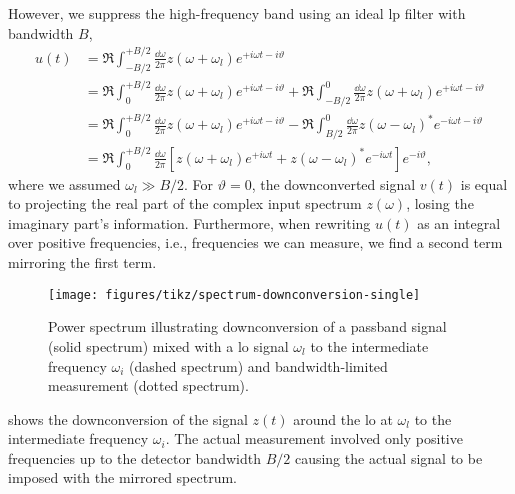 However, we suppress the high-frequency band using an ideal \gls{lp} filter with bandwidth $B$,
\begin{equation}
	\begin{split}
		u(t)
		&=
		\Re
		\int_{-B/2}^{+B/2}\frac{\dd{\omega}}{2\pi}
		z(\omega+\omega_l)
		e^{+i\omega t-i\vartheta}
		\\
		&=
		\Re
		\int_{0}^{+B/2}\frac{\dd{\omega}}{2\pi}
		z(\omega+\omega_l)
		e^{+i\omega t-i\vartheta}
		+
		\Re
		\int_{-B/2}^{0}\frac{\dd{\omega}}{2\pi}
		z(\omega+\omega_l)
		e^{+i\omega t-i\vartheta}
		\\
		&=
		\Re
		\int_{0}^{+B/2}\frac{\dd{\omega}}{2\pi}
		z(\omega+\omega_l)
		e^{+i\omega t-i\vartheta}
		-
		\Re
		\int_{B/2}^{0}\frac{\dd{\omega}}{2\pi}
		z(\omega-\omega_l)^*
		e^{-i\omega t-i\vartheta}
		\\
		&=
		\Re
		\int_{0}^{+B/2}\frac{\dd{\omega}}{2\pi}
		\left[
			z(\omega+\omega_l)
			e^{+i\omega t}
			+
			z(\omega-\omega_l)^*
			e^{-i\omega t}
		\right]
		e^{-i\vartheta}
		,
	\end{split}
	\label{eq:downconversion_real}
\end{equation}
where we assumed $\omega_l\gg B/2$.
For $\vartheta=0$, the downconverted signal $v(t)$ is equal to projecting the real part of the complex input spectrum $z(\omega)$, losing the imaginary part's information.
Furthermore, when rewriting $u(t)$ as an integral over positive frequencies, i.e., frequencies we can measure, we find a second term mirroring the first term.
\begin{figure}[htb]
	\centering
	\texttt{[image: figures/tikz/spectrum-downconversion-single]}
	\caption{Power spectrum illustrating downconversion of a passband signal (solid spectrum) mixed with a \gls{lo} signal $\omega_l$ to the intermediate frequency $\omega_i$ (dashed spectrum) and bandwidth-limited measurement (dotted spectrum).}\label{fig:spectrum_downconversion_single}
\end{figure}
 shows the downconversion of the signal $z(t)$ around the \gls{lo} at $\omega_l$ to the intermediate frequency $\omega_i$.
The actual measurement involved only positive frequencies up to the detector bandwidth $B/2$ causing the actual signal to be imposed with the mirrored spectrum.

